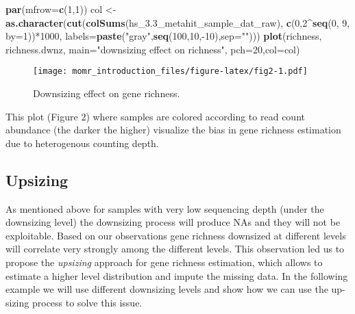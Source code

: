 \documentclass[]{article}
\newenvironment{Shaded}{\begin{snugshade}}{\end{snugshade}}
\newcommand{\KeywordTok}[1]{\textcolor[rgb]{0.13,0.29,0.53}{\textbf{{#1}}}}
\newcommand{\DataTypeTok}[1]{\textcolor[rgb]{0.13,0.29,0.53}{{#1}}}
\newcommand{\DecValTok}[1]{\textcolor[rgb]{0.00,0.00,0.81}{{#1}}}
\newcommand{\StringTok}[1]{\textcolor[rgb]{0.31,0.60,0.02}{{#1}}}
\newcommand{\NormalTok}[1]{{#1}}
\begin{document}
\begin{Shaded}
\begin{Highlighting}[]
\KeywordTok{par}\NormalTok{(}\DataTypeTok{mfrow=}\KeywordTok{c}\NormalTok{(}\DecValTok{1}\NormalTok{,}\DecValTok{1}\NormalTok{))}
\NormalTok{col <-}\StringTok{  }\KeywordTok{as.character}\NormalTok{(}\KeywordTok{cut}\NormalTok{(}\KeywordTok{colSums}\NormalTok{(hs_3.3_metahit_sample_dat_raw),}
                         \KeywordTok{c}\NormalTok{(}\DecValTok{0}\NormalTok{,}\DecValTok{2}\NormalTok{^}\KeywordTok{seq}\NormalTok{(}\DecValTok{0}\NormalTok{, }\DecValTok{9}\NormalTok{, }\DataTypeTok{by=}\DecValTok{1}\NormalTok{))*}\DecValTok{1000}\NormalTok{, }
                         \DataTypeTok{labels=}\KeywordTok{paste}\NormalTok{(}\StringTok{"gray"}\NormalTok{,}\KeywordTok{seq}\NormalTok{(}\DecValTok{100}\NormalTok{,}\DecValTok{10}\NormalTok{,-}\DecValTok{10}\NormalTok{),}\DataTypeTok{sep=}\StringTok{""}\NormalTok{)))}
\KeywordTok{plot}\NormalTok{(richness, richness.dwnz, }\DataTypeTok{main=}\StringTok{"downsizing effect on richness"}\NormalTok{,}
     \DataTypeTok{pch=}\DecValTok{20}\NormalTok{,}\DataTypeTok{col=}\NormalTok{col)}
\end{Highlighting}
\end{Shaded}

\begin{figure}[htbp]
\centering
\texttt{[image: momr\_introduction\_files/figure-latex/fig2-1.pdf]}
\caption{Downsizing effect on gene richness.}
\end{figure}

This plot (Figure 2) where samples are colored according to read count
abundance (the darker the higher) visualize the bias in gene richness
estimation due to heterogenous counting depth.

\subsection{Upsizing}\label{upsizing}

As mentioned above for samples with very low sequencing depth (under the
downsizing level) the downsizing process will produce NAs and they will
not be exploitable. Based on our observations gene richness downsized at
different levels will correlate very strongly among the different
levels. This observation led us to propose the \emph{upsizing} approach
for gene richness estimation, which allows to estimate a higher level
distribution and impute the missing data. In the following example we
will use different downsizing levels and show how we can use the
up-sizing process to solve this issue.
\end{document}
